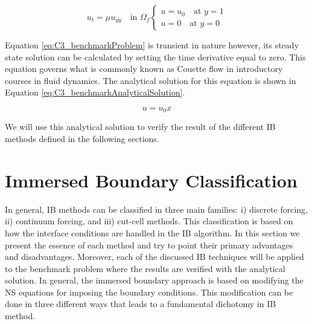 \begin{subequations}\label{eq:C3_benchmarkProblem}
\begin{equation}
	u_t = \mu u_{yy} \quad \text{in } \Omega_f
\end{equation}
\begin{equation}
\begin{cases}
	u = u_0 \quad \text{at } y = 1 \\
	u = 0 \quad \text{at } y = 0
\end{cases}
\end{equation}
\end{subequations}

Equation \eqref{eq:C3_benchmarkProblem} is transient in nature however, its steady state solution can be calculated by setting the time derivative equal to zero. This equation governs what is commonly known as Couette flow in introductory courses in fluid dynamics. The analytical solution for this equation is shown in Equation \eqref{eq:C3_benchmarkAnalyticalSolution}.

\begin{equation}\label{eq:C3_benchmarkAnalyticalSolution}
	u = u_0 x
\end{equation}

We will use this analytical solution to verify the result of the different IB methods defined in the following sections.

\section{Immersed Boundary Classification}
In general, IB methods can be classified in three main families: i) discrete forcing, ii) continuum forcing, and iii) cut-cell methods. This classification is based on how the interface conditions are handled in the IB algorithm. In this section we present the essence of each method and try to point their primary advantages and disadvantages. Moreover, each of the discussed IB techniques will be applied to the benchmark problem where the results are verified with the analytical solution. In general, the immersed boundary approach is based on modifying the NS equations for imposing the boundary conditions. This modification can be done in three different ways that leads to a fundamental dichotomy in IB method.




